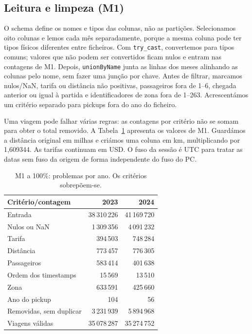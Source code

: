 \documentclass[sigconf]{acmart}
\begin{document}
\subsection{Leitura e limpeza (M1)}
O schema define os nomes e tipos das colunas, não as partições.
Selecionamos oito colunas e lemos cada mês separadamente, porque
a mesma coluna pode ter tipos físicos diferentes entre ficheiros.
Com \texttt{try\_cast}, convertemos para tipos comuns; valores que
não podem ser convertidos ficam nulos e entram nas contagens de M1.
Depois, \texttt{unionByName} junta as linhas dos meses alinhando as
colunas pelo nome, sem fazer uma junção por chave. Antes de filtrar, marcamos nulos/NaN, tarifa ou distância
não positivas, passageiros fora de 1--6, chegada anterior ou igual à
partida e identificadores de zona fora de 1--263. Acrescentámos um
critério separado para pickups fora do ano do ficheiro.

Uma viagem pode falhar várias regras: as contagens por critério não
se somam para obter o total removido. A Tabela~\ref{tab:limpeza}
apresenta os valores de M1. Guardámos a distância original em milhas
e criámos uma coluna em km, multiplicando por 1,609344. As tarifas
continuam em USD. O fuso da sessão é UTC para tratar as datas sem
fuso da origem de forma independente do fuso do PC.

\begin{table}[t]
\centering
\caption{M1 a 100\%: problemas por ano. Os critérios sobrepõem-se.}
\label{tab:limpeza}
\begin{tabular}{lrr}
\toprule
Critério/contagem & 2023 & 2024 \\
\midrule
Entrada & 38\,310\,226 & 41\,169\,720 \\
Nulos ou NaN & 1\,309\,356 & 4\,091\,232 \\
Tarifa & 394\,503 & 748\,284 \\
Distância & 773\,457 & 776\,305 \\
Passageiros & 583\,414 & 401\,638 \\
Ordem dos timestamps & 15\,569 & 13\,510 \\
Zona & 633\,591 & 425\,660 \\
Ano do pickup & 104 & 56 \\
Removidas, sem duplicar & 3\,231\,939 & 5\,894\,968 \\
Viagens válidas & 35\,078\,287 & 35\,274\,752 \\
\bottomrule
\end{tabular}
\end{table}
\end{document}
